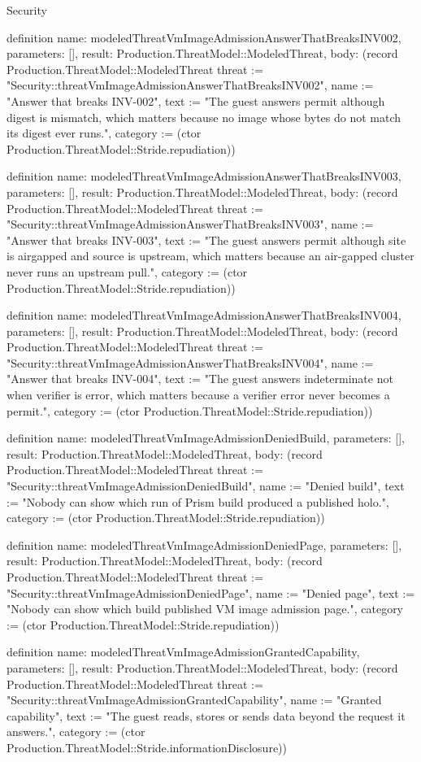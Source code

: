 \begin{lexlean}{Security}
\begin{semanticmodule}
definition{
  name: modeledThreatVmImageAdmissionAnswerThatBreaksINV002,
  parameters: [],
  result: Production.ThreatModel::ModeledThreat,
  body: (record Production.ThreatModel::ModeledThreat {threat := "Security::threatVmImageAdmissionAnswerThatBreaksINV002", name := "Answer that breaks INV-002", text := "The guest answers permit although digest is mismatch, which matters because no image whose bytes do not match its digest ever runs.", category := (ctor Production.ThreatModel::Stride.repudiation)})
}

definition{
  name: modeledThreatVmImageAdmissionAnswerThatBreaksINV003,
  parameters: [],
  result: Production.ThreatModel::ModeledThreat,
  body: (record Production.ThreatModel::ModeledThreat {threat := "Security::threatVmImageAdmissionAnswerThatBreaksINV003", name := "Answer that breaks INV-003", text := "The guest answers permit although site is airgapped and source is upstream, which matters because an air-gapped cluster never runs an upstream pull.", category := (ctor Production.ThreatModel::Stride.repudiation)})
}

definition{
  name: modeledThreatVmImageAdmissionAnswerThatBreaksINV004,
  parameters: [],
  result: Production.ThreatModel::ModeledThreat,
  body: (record Production.ThreatModel::ModeledThreat {threat := "Security::threatVmImageAdmissionAnswerThatBreaksINV004", name := "Answer that breaks INV-004", text := "The guest answers indeterminate not when verifier is error, which matters because a verifier error never becomes a permit.", category := (ctor Production.ThreatModel::Stride.repudiation)})
}

definition{
  name: modeledThreatVmImageAdmissionDeniedBuild,
  parameters: [],
  result: Production.ThreatModel::ModeledThreat,
  body: (record Production.ThreatModel::ModeledThreat {threat := "Security::threatVmImageAdmissionDeniedBuild", name := "Denied build", text := "Nobody can show which run of Prism build produced a published holo.", category := (ctor Production.ThreatModel::Stride.repudiation)})
}

definition{
  name: modeledThreatVmImageAdmissionDeniedPage,
  parameters: [],
  result: Production.ThreatModel::ModeledThreat,
  body: (record Production.ThreatModel::ModeledThreat {threat := "Security::threatVmImageAdmissionDeniedPage", name := "Denied page", text := "Nobody can show which build published VM image admission page.", category := (ctor Production.ThreatModel::Stride.repudiation)})
}

definition{
  name: modeledThreatVmImageAdmissionGrantedCapability,
  parameters: [],
  result: Production.ThreatModel::ModeledThreat,
  body: (record Production.ThreatModel::ModeledThreat {threat := "Security::threatVmImageAdmissionGrantedCapability", name := "Granted capability", text := "The guest reads, stores or sends data beyond the request it answers.", category := (ctor Production.ThreatModel::Stride.informationDisclosure)})
}


\end{semanticmodule}
\end{lexlean}
